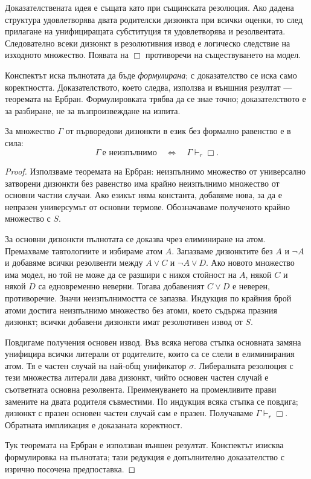 Доказателствената идея е същата като при същинската резолюция. Ако дадена структура удовлетворява двата родителски дизюнкта при всички оценки, то след прилагане на унифициращата субституция тя удовлетворява и резолвентата. Следователно всеки дизюнкт в резолютивния извод е логическо следствие на изходното множество. Появата на $\Box$ противоречи на съществуването на модел.

\begin{supp}
Конспектът иска пълнотата да бъде \emph{формулирана}; с доказателство се иска
само коректността. Доказателството, което следва, използва и външния резултат ---
теоремата на Ербран. Формулировката трябва да се знае точно; доказателството е
за разбиране, не за възпроизвеждане на изпита.
\end{supp}

\begin{keythm}
За множество $\Gamma$ от първоредови дизюнкти в език без формално равенство е в сила:
\[
\Gamma\ \text{е неизпълнимо}
\quad\Longleftrightarrow\quad
\Gamma\vdash_r\Box.
\]
\end{keythm}

\begin{proof}
Използваме теоремата на Ербран: неизпълнимо множество от универсално затворени дизюнкти без равенство има крайно неизпълнимо множество от основни частни случаи. Ако езикът няма константа, добавяме нова, за да е непразен универсумът от основни термове. Обозначаваме полученото крайно множество с $S$.

За основни дизюнкти пълнотата се доказва чрез елиминиране на атом. Премахваме тавтологиите и избираме атом $A$. Запазваме дизюнктите без $A$ и $\neg A$ и добавяме всички резолвенти между $A\lor C$ и $\neg A\lor D$. Ако новото множество има модел, но той не може да се разшири с никоя стойност на $A$, някой $C$ и някой $D$ са едновременно неверни. Тогава добавеният $C\lor D$ е неверен, противоречие. Значи неизпълнимостта се запазва. Индукция по крайния брой атоми достига неизпълнимо множество без атоми, което съдържа празния дизюнкт; всички добавени дизюнкти имат резолютивен извод от $S$.

Повдигаме получения основен извод. Във всяка негова стъпка основната замяна унифицира всички литерали от родителите, които са се слели в елиминирания атом. Тя е частен случай на най-общ унификатор $\sigma$. Либералната резолюция с тези множества литерали дава дизюнкт, чийто основен частен случай е съответната основна резолвента. Преименуването на променливите прави замените на двата родителя съвместими. По индукция всяка стъпка се повдига; дизюнкт с празен основен частен случай сам е празен. Получаваме $\Gamma\vdash_r\Box$. Обратната импликация е доказаната коректност.

Тук теоремата на Ербран е използван външен резултат. Конспектът изисква формулировка на пълнотата; тази редукция е допълнително доказателство с изрично посочена предпоставка.
\end{proof}

